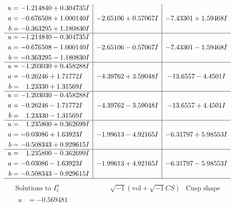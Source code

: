 \documentclass[1p]{elsarticle_modified}
\theoremstyle{definition}
\newcommand{\I}{\sqrt{-1}}
\begin{document}
$$\begin{array}{c|c|c}
\begin{aligned}
u &= -1.214840 + 0.304735 I \\
a &= -0.676508 + 1.000140 I \\
b &= -0.363295 + 1.180830 I\end{aligned}
 & -2.65106 + 0.57067 I & -7.43301 + 1.59468 I \\ \hline\begin{aligned}
u &= -1.214840 - 0.304735 I \\
a &= -0.676508 - 1.000140 I \\
b &= -0.363295 - 1.180830 I\end{aligned}
 & -2.65106 - 0.57067 I & -7.43301 - 1.59468 I \\ \hline\begin{aligned}
u &= -1.203030 + 0.458288 I \\
a &= -0.26246 + 1.71772 I \\
b &= \phantom{-}1.23330 + 1.31569 I\end{aligned}
 & -4.39762 + 3.59048 I & -13.6557 - 4.4501 I \\ \hline\begin{aligned}
u &= -1.203030 - 0.458288 I \\
a &= -0.26246 - 1.71772 I \\
b &= \phantom{-}1.23330 - 1.31569 I\end{aligned}
 & -4.39762 - 3.59048 I & -13.6557 + 4.4501 I \\ \hline\begin{aligned}
u &= \phantom{-}1.235800 + 0.362699 I \\
a &= -0.03086 + 1.63923 I \\
b &= -0.508343 + 0.929615 I\end{aligned}
 & -1.99613 - 4.92165 I & -6.31797 + 5.98553 I \\ \hline\begin{aligned}
u &= \phantom{-}1.235800 - 0.362699 I \\
a &= -0.03086 - 1.63923 I \\
b &= -0.508343 - 0.929615 I\end{aligned}
 & -1.99613 + 4.92165 I & -6.31797 - 5.98553 I\\
 \hline 
 \end{array}$$\newpage$$\begin{array}{c|c|c}  
\text{Solutions to }I^u_{1}& \I (\text{vol} + \sqrt{-1}CS) & \text{Cusp shape}\\
 \hline 
\begin{aligned}
u &= -0.569481\phantom{ +0.000000I} \\

\end{aligned}
\end{array}$$
\end{document}
